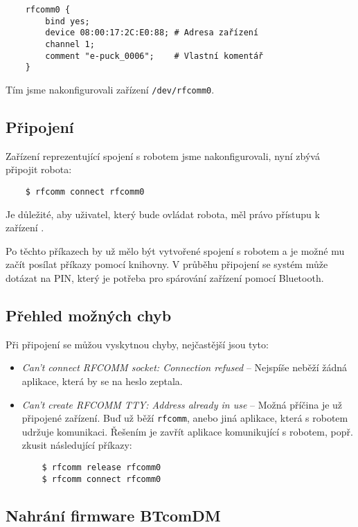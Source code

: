     \begin{verbatim}
    rfcomm0 {
        bind yes;
        device 08:00:17:2C:E0:88; # Adresa zařízení
        channel 1;
        comment "e-puck_0006";    # Vlastní komentář
    }
    \end{verbatim}

    Tím jsme nakonfigurovali zařízení {\tt /dev/rfcomm0}.

    \subsection{Připojení}

    Zařízení reprezentující spojení s robotem jsme nakonfigurovali, nyní zbývá
    připojit robota:

    \begin{verbatim}
    $ rfcomm connect rfcomm0
    \end{verbatim}

    Je důležité, aby uživatel, který bude ovládat robota, měl právo přístupu k
    zařízení .

    Po těchto příkazech by už mělo být vytvořené spojení s robotem a je možné
    mu začít posílat příkazy pomocí knihovny. V průběhu připojení se systém
    může dotázat na PIN, který je potřeba pro spárování zařízení pomocí
    Bluetooth.

    \subsection{Přehled možných chyb}
    Při připojení se můžou vyskytnou chyby, nejčastější jsou tyto:
    \begin{itemize}
    \item{{\em Can't connect RFCOMM socket: Connection refused} -- Nejspíše
        neběží žádná aplikace, která by se na heslo zeptala.}
    \item{{\em Can't create RFCOMM TTY: Address already in use} -- Možná
        příčina je už připojené zařízení. Buď už běží {\tt rfcomm}, anebo jiná
        aplikace, která s robotem udržuje komunikaci. Řešením je zavřít
        aplikace komunikující s robotem, popř. zkusit následující příkazy:
    \begin{verbatim}
    $ rfcomm release rfcomm0
    $ rfcomm connect rfcomm0
    \end{verbatim}
    }
    \end{itemize}

    \subsection{Nahrání firmware BTcomDM}

